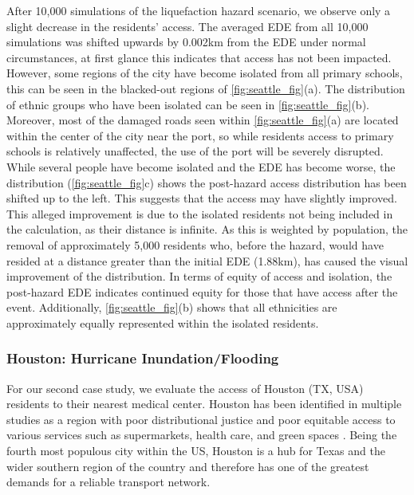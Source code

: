 \documentclass[review,3p,times,onecolumn,sort&compress,12pt]{elsarticle}
\let \cite \parencite
\begin{document}
After 10,000 simulations of the liquefaction hazard scenario, we observe only a slight decrease in the residents' access.
The averaged EDE from all 10,000 simulations was shifted upwards by 0.002km from the EDE under normal circumstances, at first glance this indicates that access has not been impacted.
However, some regions of the city have become isolated from all primary schools, this can be seen in the blacked-out regions of \autoref{fig:seattle_fig}(a). 
The distribution of ethnic groups who have been isolated can be seen in \autoref{fig:seattle_fig}(b).
Moreover, most of the damaged roads seen within \autoref{fig:seattle_fig}(a) are located within the center of the city near the port, so while residents access to primary schools is relatively unaffected, the use of the port will be severely disrupted.
While several people have become isolated and the EDE has become worse, the distribution (\autoref{fig:seattle_fig}c) shows the post-hazard access distribution has been shifted up to the left.
This suggests that the access may have slightly improved.
This alleged improvement is due to the isolated residents not being included in the calculation, as their distance is infinite.
As this is weighted by population, the removal of approximately 5,000 residents who, before the hazard, would have resided at a distance greater than the initial EDE (1.88km), has caused the visual improvement of the distribution.
In terms of equity of access and isolation, the post-hazard EDE indicates continued equity for those that have access after the event.
Additionally, \autoref{fig:seattle_fig}(b) shows that all ethnicities are approximately equally represented within the isolated residents.

\subsubsection{Houston: Hurricane Inundation/Flooding}
For our second case study, we evaluate the access of Houston (TX, USA) residents to their nearest medical center.
Houston has been identified in multiple studies as a region with poor distributional justice and poor equitable access to various services such as supermarkets, health care, and green spaces \cite{Logan2021-ineq, Significantly2012-sr, Haefner2021-ro, The_Trust_for_Public_Land2018-cm}.
Being the fourth most populous city within the US, Houston is a hub for Texas and the wider southern region of the country and therefore has one of the greatest demands for a reliable transport network.
\end{document}
